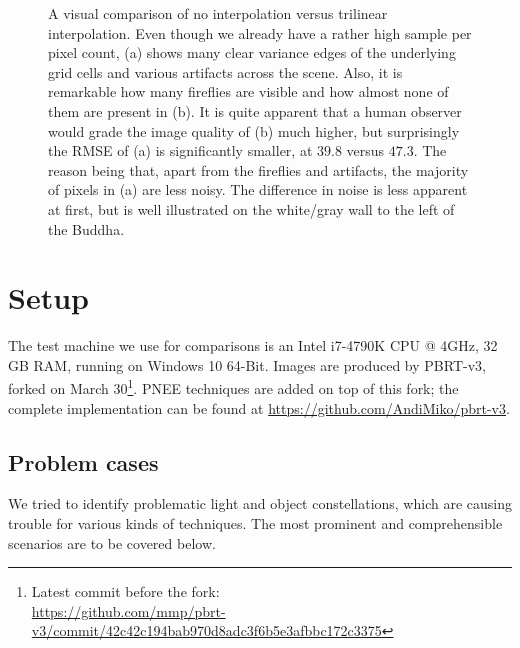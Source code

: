 \begin{figure}
\caption{A visual comparison of no interpolation versus trilinear interpolation. Even though we already have a rather high sample per pixel count, (a) shows many clear variance edges of the underlying grid cells and various artifacts across the scene. Also, it is remarkable how many fireflies are visible and how almost none of them are present in (b). It is quite apparent that a human observer would grade the image quality of (b) much higher, but surprisingly the RMSE of (a) is significantly smaller, at $39.8$ versus $47.3$. The reason being that, apart from the fireflies and artifacts, the majority of pixels in (a) are less noisy. The difference in noise is less apparent at first, but is well illustrated on the white/gray wall to the left of the Buddha.}
\label{fig:intComparison}
\end{figure}


\section{Setup}
\label{sec:setup}
The test machine we use for comparisons is an Intel i7-4790K CPU @ 4GHz, 32 GB RAM, running on Windows 10 64-Bit. Images are produced by PBRT-v3, forked on March 30\footnote{Latest commit before the fork: \\ \url{https://github.com/mmp/pbrt-v3/commit/42c42c194bab970d8adc3f6b5e3afbbc172c3375}}. PNEE techniques are added on top of this fork; the complete implementation can be found at \url{https://github.com/AndiMiko/pbrt-v3}.

\subsection{Problem cases}

We tried to identify problematic light and object constellations, which are causing trouble for various kinds of techniques. The most prominent and comprehensible scenarios are to be covered below. 

